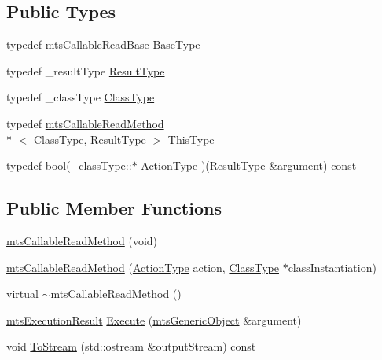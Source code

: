 \subsection*{Public Types}
\begin{DoxyCompactItemize}
\item 
typedef \hyperlink{classmts_callable_read_base}{mts\-Callable\-Read\-Base} \hyperlink{classmts_callable_read_method_a83876b0239f91889b077ab015b11f297}{Base\-Type}
\item 
typedef \-\_\-result\-Type \hyperlink{classmts_callable_read_method_ae1add51b4fb434797e00a79fe31aa7de}{Result\-Type}
\item 
typedef \-\_\-class\-Type \hyperlink{classmts_callable_read_method_a44650138085a29d60a4f3cb3616abbbf}{Class\-Type}
\item 
typedef \hyperlink{classmts_callable_read_method}{mts\-Callable\-Read\-Method}\\*
$<$ \hyperlink{classmts_callable_read_method_a44650138085a29d60a4f3cb3616abbbf}{Class\-Type}, \hyperlink{classmts_callable_read_method_ae1add51b4fb434797e00a79fe31aa7de}{Result\-Type} $>$ \hyperlink{classmts_callable_read_method_af176b353a29900c0d650356c559c4cdd}{This\-Type}
\item 
typedef bool(\-\_\-class\-Type\-::$\ast$ \hyperlink{classmts_callable_read_method_a859894f8cceaba38ff140b96f4b8ae11}{Action\-Type} )(\hyperlink{classmts_callable_read_method_ae1add51b4fb434797e00a79fe31aa7de}{Result\-Type} \&argument) const 
\end{DoxyCompactItemize}
\subsection*{Public Member Functions}
\begin{DoxyCompactItemize}
\item 
\hyperlink{classmts_callable_read_method_aaf583c2ff199486fe6691a1b50e0b67f}{mts\-Callable\-Read\-Method} (void)
\item 
\hyperlink{classmts_callable_read_method_a4295f9c815be10344bdb82a507a6906f}{mts\-Callable\-Read\-Method} (\hyperlink{classmts_callable_read_method_a859894f8cceaba38ff140b96f4b8ae11}{Action\-Type} action, \hyperlink{classmts_callable_read_method_a44650138085a29d60a4f3cb3616abbbf}{Class\-Type} $\ast$class\-Instantiation)
\item 
virtual \hyperlink{classmts_callable_read_method_a5ec1e7cf4524e99d9d08869395dc4e97}{$\sim$mts\-Callable\-Read\-Method} ()
\item 
\hyperlink{classmts_execution_result}{mts\-Execution\-Result} \hyperlink{classmts_callable_read_method_a832d2b329b3579304e1049be4d175b8d}{Execute} (\hyperlink{classmts_generic_object}{mts\-Generic\-Object} \&argument)
\item 
void \hyperlink{classmts_callable_read_method_ae08bd42677d0895a7fd4c80cc54cb4ff}{To\-Stream} (std\-::ostream \&output\-Stream) const 
\end{DoxyCompactItemize}
